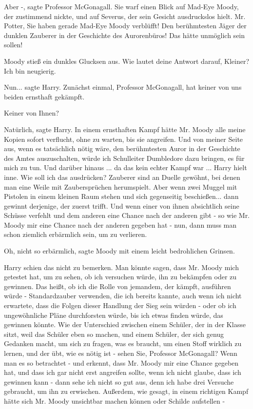 \glqq{}Aber -\grqq{}, sagte Professor McGonagall. Sie warf einen Blick auf
Mad-Eye Moody, der zustimmend nickte, und auf Severus, der sein Gesicht
ausdruckslos hielt. \glqq{}Mr. Potter, Sie haben gerade Mad-Eye Moody verblüfft!
Den berühmtesten Jäger der dunklen Zauberer in der Geschichte des Aurorenbüros!
Das hätte unmöglich sein sollen!\grqq{}

Moody stieß ein dunkles Glucksen aus. \glqq{}Wie lautet deine Antwort darauf,
Kleiner? Ich bin neugierig.\grqq{}

\glqq{}Nun...\grqq{} sagte Harry. \glqq{}Zunächst einmal, Professor McGonagall,
hat keiner von uns beiden ernsthaft gekämpft.\grqq{}

\glqq{}Keiner von Ihnen?\grqq{}

\glqq{}Natürlich\grqq{}, sagte Harry. \glqq{}In einem ernsthaften Kampf hätte Mr.
Moody alle meine Kopien sofort verflucht, ohne zu warten, bis sie angreifen. Und
von meiner Seite aus, wenn es tatsächlich nötig wäre, den berühmtesten Auror in
der Geschichte des Amtes auszuschalten, würde ich Schulleiter Dumbledore dazu
bringen, es für mich zu tun. Und darüber hinaus ... da das kein echter Kampf war
...\grqq{} Harry hielt inne. \glqq{}Wie soll ich das ausdrücken? Zauberer sind an
Duelle gewöhnt, bei denen man eine Weile mit Zaubersprüchen herumspielt. Aber
wenn zwei Muggel mit Pistolen in einem kleinen Raum stehen und sich gegenseitig
beschießen... dann gewinnt derjenige, der zuerst trifft. Und wenn einer von
ihnen absichtlich seine Schüsse verfehlt und dem anderen eine Chance nach der
anderen gibt - so wie Mr. Moody mir eine Chance nach der anderen gegeben hat -
nun, dann muss man schon ziemlich erbärmlich sein, um zu verlieren.\grqq{}

\glqq{}Oh, nicht so erbärmlich\grqq{}, sagte Moody mit einem leicht bedrohlichen
Grinsen.

Harry schien das nicht zu bemerken. \glqq{}Man könnte sagen, dass Mr. Moody mich
getestet hat, um zu sehen, ob ich versuchen würde, ihn zu bekämpfen oder zu
gewinnen. Das heißt, ob ich die Rolle von jemandem, der kämpft, ausführen würde
- Standardzauber verwenden, die ich bereits kannte, auch wenn ich nicht
erwartete, dass die Folgen dieser Handlung der Sieg sein würden - oder ob ich
ungewöhnliche Pläne durchforsten würde, bis ich etwas finden würde, das gewinnen
könnte. Wie der Unterschied zwischen einem Schüler, der in der Klasse sitzt,
weil das Schüler eben so machen, und einem Schüler, der sich genug Gedanken
macht, um sich zu fragen, was es braucht, um einen Stoff wirklich zu lernen, und
der übt, wie es nötig ist - sehen Sie, Professor McGonagall? Wenn man es so
betrachtet - und erkennt, dass Mr. Moody mir eine Chance gegeben hat, und dass
ich gar nicht erst angreifen sollte, wenn ich nicht glaube, dass ich gewinnen
kann - dann sehe ich nicht so gut aus, denn ich habe drei Versuche gebraucht, um
ihn zu erwischen. Außerdem, wie gesagt, in einem richtigen Kampf hätte sich Mr.
Moody unsichtbar machen können oder Schilde aufstellen -\grqq{}

